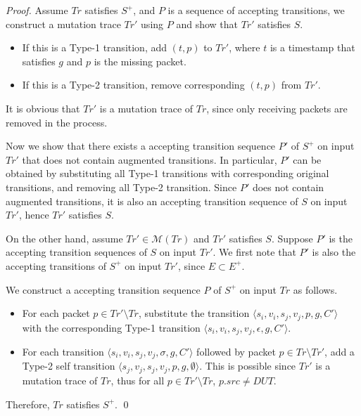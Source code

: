 \begin{proof}
  Assume $Tr$ satisfies $S^+$, and $P$ is a sequence of accepting transitions,
  we construct a mutation trace $Tr'$ using $P$ and show that $Tr'$ satisfies
  $S$.

  \begin{itemize}
    \item If this is a Type-1 transition, add $(t, p)$ to $Tr'$, where $t$ is a
      timestamp that satisfies $g$ and $p$ is the missing packet.
    \item If this is a Type-2 transition, remove corresponding $(t, p)$ from
      $Tr'$.
  \end{itemize}
  It is obvious that $Tr'$ is a mutation trace of $Tr$, since only receiving
  packets are removed in the process.

  Now we show that there exists a accepting transition sequence $P'$ of $S^+$ on
  input $Tr'$ that does not contain augmented transitions.  In particular, $P'$
  can be obtained by substituting all Type-1 transitions with corresponding
  original transitions, and removing all Type-2 transition.  Since $P'$ does not
  contain augmented transitions, it is also an accepting transition sequence of
  $S$ on input $Tr'$, hence $Tr'$ satisfies $S$.

  On the other hand, assume $Tr' \in \mathcal{M}(Tr)$ and $Tr'$ satisfies $S$.
  Suppose $P'$ is the accepting transition sequences of $S$ on input $Tr'$.
  We first note that $P'$ is also the accepting transitions of $S^+$ on input
  $Tr'$, since $E \subset E^+$.

  We construct a accepting transition sequence $P$ of $S^+$ on input $Tr$ as
  follows.
  \begin{itemize}
    \item For each packet $p \in Tr' \setminus Tr$, substitute the transition
      $\langle s_i, v_i, s_j, v_j, p, g, C'\rangle$ with the corresponding Type-1
      transition $\langle s_i, v_i, s_j, v_j, \epsilon, g, C'\rangle$.
    \item For each transition $\langle s_i, v_i, s_j, v_j, \sigma, g, C'\rangle$
      followed by packet $p \in Tr\setminus Tr'$, add a Type-2 self
      transition $\langle s_j, v_j, s_j, v_j, p, g, \emptyset\rangle$. This is
      possible since $Tr'$ is a mutation trace of $Tr$, thus  for all $p \in Tr'
      \setminus Tr$, $p.src \ne DUT$.
  \end{itemize}
  Therefore, $Tr$ satisfies $S^+$.
  \qed
\end{proof}

